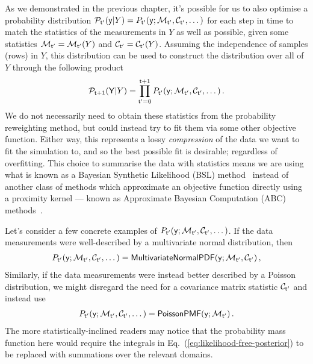 As we demonstrated in the previous chapter, it's possible for us to also optimise a probability distribution ${\cal P}_{{\sf t}'}({\sf y}\vert Y) = P_{{\sf t}'}({\sf y};{\cal M}_{{\sf t}'},{\cal C}_{{\sf t}'},\dots )$ for each step in time to match the statistics of the measurements in $Y$ as well as possible, given some statistics ${\cal M}_{{\sf t}'}={\cal M}_{{\sf t}'}(Y)$ and ${\cal C}_{{\sf t}'}={\cal C}_{{\sf t}'}(Y)$. Assuming the independence of samples (rows) in $Y$, this distribution can be used to construct the distribution over all of $Y$ through the following product
\begin{align}
{\cal P}_{{\sf t}+1}({\sf Y}\vert Y) = \prod_{{\sf t}'=0}^{{\sf t}+1}P_{{\sf t}'}({\sf y};{\cal M}_{{\sf t}'},{\cal C}_{{\sf t}'},\dots ) \,.
\end{align}
We do not necessarily need to obtain these statistics from the probability reweighting method, but could instead try to fit them via some other objective function. Either way, this represents a lossy \emph{compression} of the data we want to fit the simulation to, and so the best possible fit is desirable; regardless of overfitting. This choice to summarise the data with statistics means we are using what is known as a Bayesian Synthetic Likelihood (BSL) method~\cite{price2018bayesian,wood2010statistical} instead of another class of methods which approximate an objective function directly using a proximity kernel --- known as Approximate Bayesian Computation (ABC) methods~\cite{sisson2018handbook}.

Let's consider a few concrete examples of $P_{{\sf t}'}({\sf y};{\cal M}_{{\sf t}'},{\cal C}_{{\sf t}'}, \dots )$. If the data measurements were well-described by a multivariate normal distribution, then
\begin{align}
P_{{\sf t}'}({\sf y};{\cal M}_{{\sf t}'},{\cal C}_{{\sf t}'}, \dots ) = {\sf MultivariateNormalPDF}({\sf y};{\cal M}_{{\sf t}'},{\cal C}_{{\sf t}'})\,,
\end{align}
Similarly, if the data measurements were instead better described by a Poisson distribution, we might disregard the need for a covariance matrix statistic ${\cal C}_{{\sf t}'}$ and instead use
\begin{align}
P_{{\sf t}'}({\sf y};{\cal M}_{{\sf t}'},{\cal C}_{{\sf t}'}, \dots ) = {\sf PoissonPMF}({\sf y};{\cal M}_{{\sf t}'})\,.
\end{align}
The more statistically-inclined readers may notice that the probability mass function here would require the integrals in Eq.~(\ref{eq:likelihood-free-posterior}) to be replaced with summations over the relevant domains.

